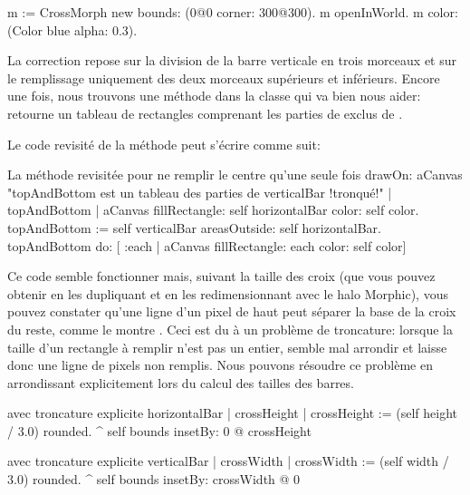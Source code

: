 \documentclass[a4paper,10pt,twoside]{book}
\begin{document}

\begin{code}{}
m := CrossMorph new bounds: (0@0 corner: 300@300).
m openInWorld.
m color: (Color blue alpha: 0.3).
\end{code}

\noindent
La correction repose sur la division de la barre verticale en trois
morceaux et sur le remplissage uniquement des deux morceaux supérieurs et inférieurs.
Encore une fois, nous trouvons une méthode dans la classe
 qui va bien nous aider:  
retourne un tableau de rectangles comprenant les parties de 
exclus de . 

Le code revisité de la méthode  peut s'écrire comme suit:

\begin{method}{La méthode  revisitée pour ne remplir le centre qu'une seule fois}
drawOn: aCanvas 
    "topAndBottom est un tableau des parties de verticalBar !tronqué!"
	| topAndBottom |
	aCanvas fillRectangle: self horizontalBar color: self color.
	topAndBottom := self verticalBar areasOutside: self horizontalBar. 
	topAndBottom do: [ :each | aCanvas fillRectangle: each color: self color]
\end{method}

Ce code semble fonctionner mais, suivant la taille des croix 
(que vous pouvez obtenir en les dupliquant et en les redimensionnant
avec le halo Morphic), vous pouvez constater qu'une ligne d'un pixel
de haut peut séparer la base de la croix du reste, comme le montre
.
Ceci est du à un problème de troncature: %
lorsque la taille d'un rectangle à remplir n'est pas un entier,
 semble mal arrondir et laisse donc une
ligne de pixels non remplis.
Nous pouvons résoudre ce problème en arrondissant explicitement
lors du calcul des tailles des barres.

\begin{method}{ avec troncature explicite}
horizontalBar
	| crossHeight |
	crossHeight := (self height / 3.0) rounded.
	^ self bounds insetBy: 0 @ crossHeight
\end{method}

\begin{method}{ avec troncature explicite}
verticalBar
	| crossWidth |
	crossWidth := (self width / 3.0) rounded.
	^ self bounds insetBy: crossWidth @ 0
\end{method}
\end{document}
